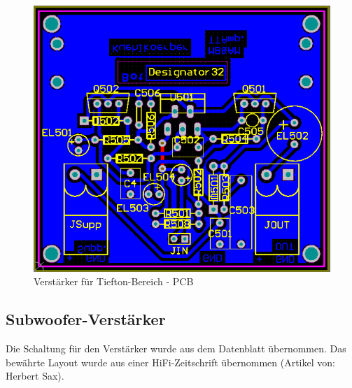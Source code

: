 \begin{figure} [H]
	\centering	
	\includegraphics[width=1\textwidth]{img/Print5/5_TTVerstaerker-PCB.PNG}
	\caption{Verstärker für Tiefton-Bereich - PCB}
	\label {fig:4.4.3.1}
\end{figure}


\newpage
\subsection{Subwoofer-Verstärker}
Die Schaltung für den Verstärker wurde aus dem Datenblatt übernommen. %
Das bewährte Layout wurde aus einer HiFi-Zeitschrift übernommen (Artikel von: Herbert Sax).
